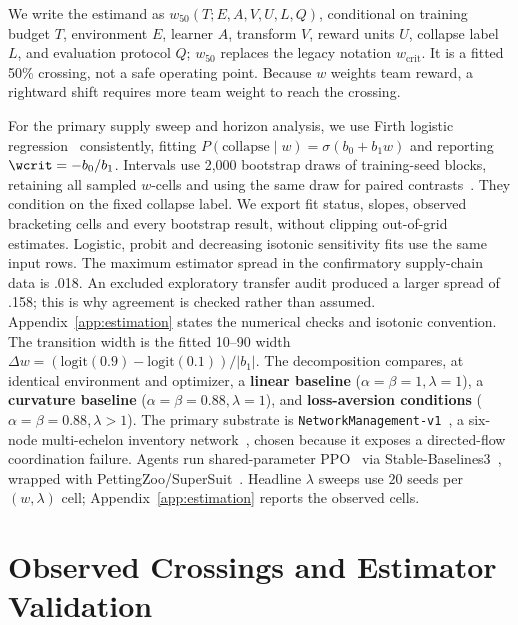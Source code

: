 We write the estimand as $w_{50}(T;E,A,V,U,L,Q)$, conditional on training
budget $T$, environment $E$, learner $A$, transform $V$, reward units $U$,
collapse label $L$, and evaluation protocol $Q$; $w_{50}$ replaces the legacy
notation $w_{\mathrm{crit}}$. It is a fitted 50\% crossing, not a safe operating
point. Because $w$ weights team reward, a rightward shift requires more team
weight to reach the crossing.

For the primary supply sweep and horizon analysis, we use
Firth logistic regression~\citep{firth1993} consistently, fitting
$P(\mathrm{collapse}\mid w)=\sigma(b_0+b_1w)$ and reporting $\wcrit=-b_0/b_1$.
Intervals use 2,000 bootstrap draws of training-seed blocks, retaining all sampled
$w$-cells and using the same draw for paired contrasts~\citep{efron1993bootstrap}.
They condition on the fixed collapse label. We export fit status, slopes, observed bracketing
cells and every bootstrap result, without clipping out-of-grid estimates.
Logistic, probit and decreasing isotonic sensitivity fits use the same input rows.
The maximum estimator spread in the confirmatory supply-chain data is .018. An excluded exploratory
transfer audit produced a larger spread of .158; this is why agreement is checked rather than assumed.
Appendix~\ref{app:estimation} states the numerical checks and isotonic convention.
The
transition width is the fitted 10--90 width $\Delta w=(\mathrm{logit}(0.9)-\mathrm{logit}(0.1))/|b_1|$.
The decomposition compares, at identical environment and optimizer, a \textbf{linear baseline}
($\alpha{=}\beta{=}1,\lambda{=}1$), a \textbf{curvature baseline} ($\alpha{=}\beta{=}0.88,\lambda{=}1$),
and \textbf{loss-\allowbreak aversion conditions} ($\alpha{=}\beta{=}0.88,\lambda>1$). The primary substrate is
\texttt{NetworkManagement-v1}~\citep{hubbs2020orgym}, a six-node multi-echelon inventory
network~\citep{oroojlooyjadid2022,gijsbrechts2022,marlim2023}, chosen because it exposes a
directed-flow coordination failure. Agents run shared-parameter PPO~\citep{schulman2017ppo} via
Stable-Baselines3~\citep{raffin2021sb3}, wrapped with
PettingZoo/SuperSuit~\citep{terry2021pettingzoo,terry2020supersuit}. Headline $\lambda$ sweeps use
$20$ seeds per $(w,\lambda)$ cell; Appendix~\ref{app:estimation} reports the observed cells.

\section{Observed Crossings and Estimator Validation}
\label{sec:results}

